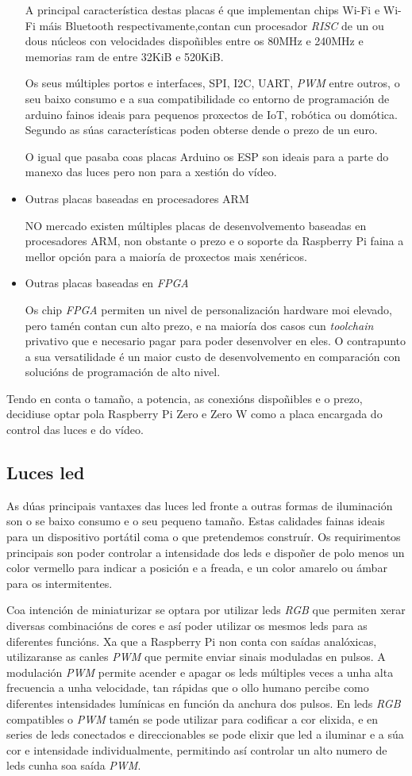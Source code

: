 \begin{itemize}
A principal característica destas placas é que implementan chips Wi-Fi e Wi-Fi máis Bluetooth respectivamente,contan cun procesador \emph{RISC} de un ou dous núcleos con velocidades dispoñibles entre os 80MHz e 240MHz e memorias ram de entre 32KiB e 520KiB.

Os seus múltiples portos e interfaces, SPI, I2C, UART, \emph{PWM} entre outros, o seu baixo consumo e a sua compatibilidade co entorno de programación de arduino fainos ideais para pequenos proxectos de IoT, robótica ou domótica. Segundo as súas características poden obterse dende o prezo de un euro.

O igual que pasaba coas placas Arduino os ESP son ideais para a parte do manexo das luces pero non para a xestión do vídeo.
    \item Outras placas baseadas en procesadores ARM

NO mercado existen múltiples placas de desenvolvemento baseadas en procesadores ARM, non obstante o prezo e o soporte da Raspberry Pi faina a mellor opción para a maioría de proxectos mais xenéricos.
    \item Outras placas baseadas en \emph{FPGA}

Os chip \emph{FPGA} permiten un nivel de personalización hardware moi elevado, pero tamén contan cun alto prezo, e na maioría dos casos cun \emph{toolchain} privativo que e necesario pagar para poder desenvolver en eles. O contrapunto a sua versatilidade é un maior custo de desenvolvemento en comparación con solucións de programación de alto nivel.
\end{itemize}
Tendo en conta o tamaño, a potencia, as conexións dispoñibles e o prezo, decidiuse optar pola Raspberry Pi Zero e Zero W como a placa encargada do control das luces e do vídeo.

\subsection{Luces led}
As dúas principais vantaxes das luces led fronte a outras formas de iluminación son o se baixo consumo e o seu pequeno tamaño. Estas calidades fainas ideais para un dispositivo portátil coma o que pretendemos construír.
Os requirimentos principais son poder controlar a intensidade dos leds e dispoñer de polo menos un color vermello para indicar a posición e a freada, e un color amarelo ou ámbar para os intermitentes.

Coa intención de miniaturizar se optara por utilizar leds \emph{RGB} que permiten xerar diversas combinacións de cores e así poder utilizar os mesmos leds para as diferentes funcións.
Xa que a Raspberry Pi non conta con saídas analóxicas, utilizaranse as canles \emph{PWM} que permite enviar sinais moduladas en pulsos. A modulación \emph{PWM} permite acender e apagar os leds múltiples veces a unha alta frecuencia a unha velocidade, tan rápidas que o ollo humano percibe como diferentes intensidades lumínicas en función da anchura dos pulsos. En leds \emph{RGB} compatibles o \emph{PWM} tamén se pode utilizar para codificar a cor elixida, e en series de leds conectados e direccionables se pode elixir que led a iluminar e a súa cor e intensidade individualmente, permitindo así controlar un alto numero de leds cunha soa saída \emph{PWM}.

